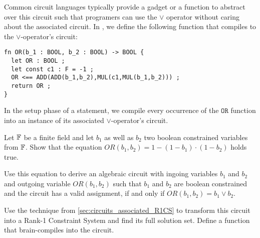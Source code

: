 Common circuit languages typically provide a gadget or a function to abstract over this circuit such that programers can use the $\vee$ operator without caring about the associated circuit. In , we define the following function that compiles to the $\vee$-operator's circuit:
\begin{lstlisting}
fn OR(b_1 : BOOL, b_2 : BOOL) -> BOOL {
  let OR : BOOL ;
  let const c1 : F = -1 ;
  OR <== ADD(ADD(b_1,b_2),MUL(c1,MUL(b_1,b_2))) ;
  return OR ;
}
\end{lstlisting}
In the setup phase of a statement, we compile every occurrence of the $\mathtt{OR}$ function into an instance of its associated $\vee$-operator's circuit.
\begin{exercise} Let $\mathbb{F}$ be a finite field and let $b_1$ as well as $b_2$ two boolean constrained variables from $\mathbb{F}$. Show that the equation 
$OR(b_1,b_2) = 1 - (1 - b_1)\cdot (1 - b_2)$ holds true.

Use this equation to derive an algebraic circuit with ingoing variables $b_1$ and $b_2$ and outgoing variable $OR(b_1,b_2)$ such that $b_1$ and $b_2$ are boolean constrained and the circuit has a valid assignment, if and only if $OR(b_1,b_2) = b_1 \vee b_2$.  

Use the technique from \ref{sec:circuits_associated_R1CS} to transform this circuit into a Rank-1 Constraint System and find its full solution set. Define a  function that brain-compiles into the circuit. 
\begin{comment}
\begin{center}
\digraph[scale=0.4]{BOOLOR}{
  forcelabels=true;
  center=true;
  splines=ortho;
  nodesep= 2.0;
  nOR1 -> nOR5 [xlabel="S_1  "] ;
  nOR2 -> nOR7 [xlabel="S_2  "] ;
  nOR3 -> {nOR5, nOR7, nOR10} ;
  nOR4 -> {nOR6, nOR8, nOR11} ;
  nOR5 -> nOR6; 
  nOR6 -> nOR9 ;
  nOR7 -> nOR8 ;
  nOR8 -> nOR9 ;
  nOR9 -> nOR10 [xlabel="S_3  "] ;
  nOR10 -> nOR11 ;
  nOR11 -> nOR12 [xlabel="S_4  "] ;


\end{comment}
\end{exercise}

